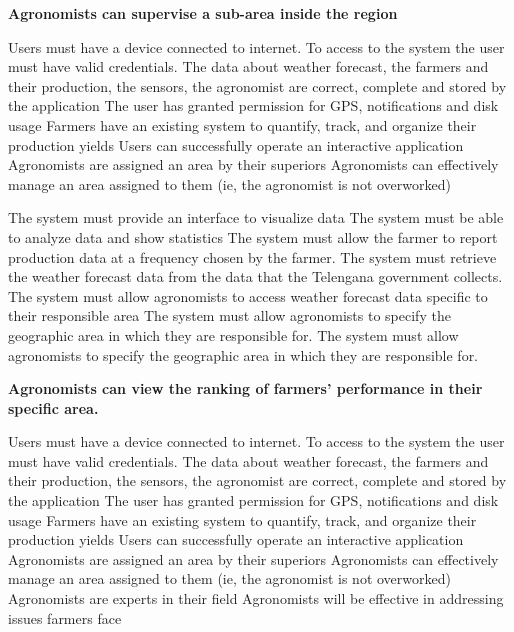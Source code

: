 \begin{itemize}
 \textbf{Agronomists can supervise a sub-area inside the region}
\begin{itemize}
  Users must have a device connected to internet.
 To access to the system the user must have valid credentials.
 The data about weather forecast, the farmers and their production, the sensors, the agronomist are correct, complete and stored by the application
 The user has granted permission for GPS, notifications and disk usage
 Farmers have an existing system to quantify, track, and organize their production yields
 Users can successfully operate an interactive application
 Agronomists are assigned an area by their superiors
 Agronomists can effectively manage an area assigned to them (ie, the agronomist is not overworked)

 The system must provide an interface to visualize data
 The system must be able to analyze data and show statistics
 The system must allow the farmer to report production data at a frequency chosen by the farmer.
 The system must retrieve the weather forecast data from the data that the Telengana government collects.
 The system must allow agronomists to access weather forecast data specific to their responsible area
 The system must allow agronomists to specify the geographic area in which they are responsible for.
 The system must allow agronomists to specify the geographic area in which they are responsible for.
\end{itemize}

 \textbf{Agronomists can view the ranking of farmers’ performance in their specific area.}
\begin{itemize}
  Users must have a device connected to internet.
 To access to the system the user must have valid credentials.
 The data about weather forecast, the farmers and their production, the sensors, the agronomist are correct, complete and stored by the application
 The user has granted permission for GPS, notifications and disk usage
 Farmers have an existing system to quantify, track, and organize their production yields
 Users can successfully operate an interactive application
 Agronomists are assigned an area by their superiors
 Agronomists can effectively manage an area assigned to them (ie, the agronomist is not overworked)
 Agronomists are experts in their field
 Agronomists will be effective in addressing issues farmers face



\end{itemize}
\end{itemize}
